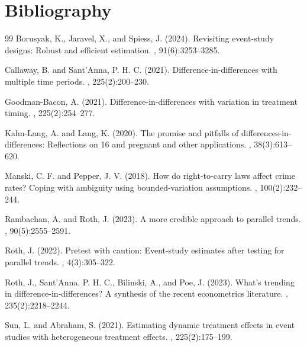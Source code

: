 \documentclass[11pt]{article}
\theoremstyle{definition}
\theoremstyle{plain}
\theoremstyle{remark}
\begin{document}
\section*{Bibliography}
\begin{thebibliography}{99}
Borusyak, K., Jaravel, X., and Spiess, J. (2024).
\newblock Revisiting event-study designs: Robust and efficient estimation.
, 91(6):3253--3285.

Callaway, B. and Sant'Anna, P. H. C. (2021).
\newblock Difference-in-differences with multiple time periods.
, 225(2):200--230.

Goodman-Bacon, A. (2021).
\newblock Difference-in-differences with variation in treatment timing.
, 225(2):254--277.

Kahn-Lang, A. and Lang, K. (2020).
\newblock The promise and pitfalls of differences-in-differences: Reflections on 16 and pregnant and other applications.
, 38(3):613--620.

Manski, C. F. and Pepper, J. V. (2018).
\newblock How do right-to-carry laws affect crime rates? Coping with ambiguity using bounded-variation assumptions.
, 100(2):232--244.

Rambachan, A. and Roth, J. (2023).
\newblock A more credible approach to parallel trends.
, 90(5):2555--2591.

Roth, J. (2022).
\newblock Pretest with caution: Event-study estimates after testing for parallel trends.
, 4(3):305--322.

Roth, J., Sant'Anna, P. H. C., Bilinski, A., and Poe, J. (2023).
\newblock What's trending in difference-in-differences? A synthesis of the recent econometrics literature.
, 235(2):2218--2244.

Sun, L. and Abraham, S. (2021).
\newblock Estimating dynamic treatment effects in event studies with heterogeneous treatment effects.
, 225(2):175--199.
\end{thebibliography}
\end{document}

